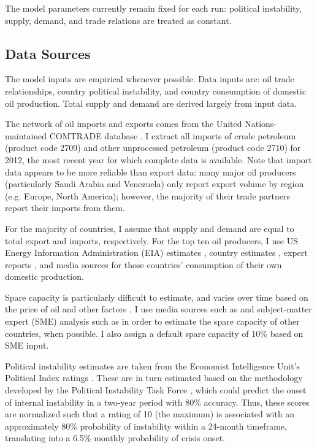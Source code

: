 \documentclass{article}
\begin{document}
The model parameters currently remain fixed for each run: political instability, supply, demand, and trade relations are treated as constant. 

\subsection{Data Sources}
The model inputs are empirical whenever possible. Data inputs are: oil trade relationships, country political instability, and country consumption of domestic oil production. Total supply and demand are derived largely from input data.

The network of oil imports and exports comes from the United Nations-maintained COMTRADE database \citep{un_2013}. I extract all imports of crude petroleum (product code 2709) and other unprocessed petroleum (product code 2710) for 2012, the most recent year for which complete data is available. Note that import data appears to be more reliable than export data: many major oil producers (particularly Saudi Arabia and Venezuela) only report export volume by region (e.g. Europe, North America); however, the majority of their trade partners report their imports from them.

For the majority of countries, I assume that supply and demand are equal to total export and imports, respectively. For the top ten oil producers, I use US Energy Information Administration (EIA) estimates \citep{eia_2013}, country estimates \citep{canada_2009,eia_domestic}, expert reports \citep{mohamedi_2010}, and media sources \citep{rasmi_2013} for those countries' consumption of their own domestic production. 

Spare capacity is particularly difficult to estimate, and varies over time based on the price of oil and other factors \citep{mearns_2012}. I use media sources such as \citet{daya_2012} and subject-matter expert (SME) analysis such as \citet{mearns_2012} in order to estimate the spare capacity of other countries, when possible. I also assign a default spare capacity of 10\% based on SME input.

Political instability estimates are taken from the Economist Intelligence Unit's Political Index ratings \citep{eiu_2013}. These are in turn estimated based on the methodology developed by the Political Instability Task Force \citep{goldstone_2005}, which could predict the onset of internal instability in a two-year period with 80\% accuracy. Thus, these scores are normalized such that a rating of 10 (the maximum) is associated with an approximately 80\% probability of instability within a 24-month timeframe, translating into a 6.5\% monthly probability of crisis onset.
\end{document}

